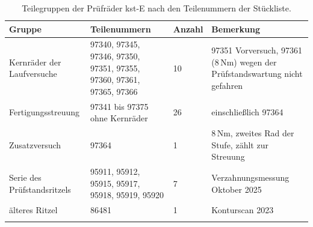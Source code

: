 \begin{table}[htbp]
    \caption{Teilegruppen der Prüfräder kst-E nach den Teilenummern der Stückliste.}
    \label{tab:teilegruppen_kste}
    \centering
    \small
    \begin{tabular}{L{3.4cm}L{5.4cm}lL{4.4cm}}
        Gruppe                      & Teilenummern                                                        & Anzahl & Bemerkung                                                                          \\
        \hline
        Kernräder der Laufversuche  & 97340, 97345, 97346, 97350, 97351, 97355, 97360, 97361, 97365, 97366 & 10     & 97351 Vorversuch, 97361 ($8$\,Nm) wegen der Prüfstandswartung nicht gefahren \\
        \hline
        Fertigungsstreuung          & 97341 bis 97375 ohne Kernräder                                       & 26     & einschließlich 97364                                                               \\
        \hline
        Zusatzversuch               & 97364                                                                & 1      & $8$\,Nm, zweites Rad der Stufe, zählt zur Streuung                                 \\
        \hline
        Serie des Prüfstandsritzels & 95911, 95912, 95915, 95917, 95918, 95919, 95920                      & 7      & Verzahnungsmessung Oktober 2025                                                    \\
        \hline
        älteres Ritzel              & 86481                                                                & 1      & Konturscan 2023                                                                    \\
        \hline
    \end{tabular}
\end{table}


